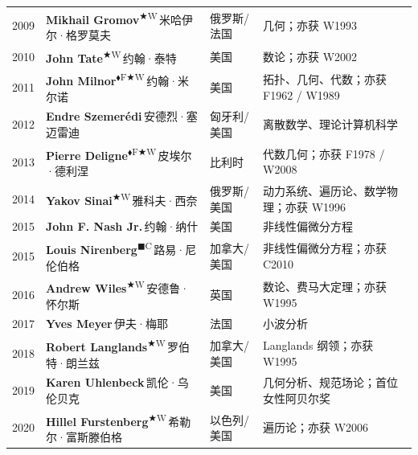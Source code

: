\documentclass[a4paper,10pt]{article}
\newcommand{\Fbadge}{\textsuperscript{\normalfont\scriptsize\sffamily\color{fieldsclr}$\blacklozenge$F}}
\newcommand{\Wbadge}{\textsuperscript{\normalfont\scriptsize\sffamily\color{wolfclr}$\bigstar$W}}
\newcommand{\Cbadge}{\textsuperscript{\normalfont\scriptsize\sffamily\color{chernclr}$\blacksquare$C}}
\begin{document}
\begin{longtable}{
  >{\raggedright}m{1.4cm}
  >{\raggedright}m{7.0cm}
  >{\raggedright}m{4.5cm}
  >{\raggedright\arraybackslash}m{9.5cm}
}
{\color{yearcolor}2009} & {\bfseries Mikhail Gromov}\Wbadge\,{\small\color{mutedgray}米哈伊尔·格罗莫夫} & 俄罗斯/法国 & {\small\color{fieldcolor}几何；亦获 W1993} \\[2pt]
{\color{yearcolor}2010} & {\bfseries John Tate}\Wbadge\,{\small\color{mutedgray}约翰·泰特} & 美国 & {\small\color{fieldcolor}数论；亦获 W2002} \\[2pt]
{\color{yearcolor}2011} & {\bfseries John Milnor}\Fbadge\Wbadge\,{\small\color{mutedgray}约翰·米尔诺} & 美国 & {\small\color{fieldcolor}拓扑、几何、代数；亦获 F1962 / W1989} \\[2pt]
{\color{yearcolor}2012} & {\bfseries Endre Szemerédi}\,{\small\color{mutedgray}安德烈·塞迈雷迪} & 匈牙利/美国 & {\small\color{fieldcolor}离散数学、理论计算机科学} \\[2pt]
{\color{yearcolor}2013} & {\bfseries Pierre Deligne}\Fbadge\Wbadge\,{\small\color{mutedgray}皮埃尔·德利涅} & 比利时 & {\small\color{fieldcolor}代数几何；亦获 F1978 / W2008} \\[2pt]
{\color{yearcolor}2014} & {\bfseries Yakov Sinai}\Wbadge\,{\small\color{mutedgray}雅科夫·西奈} & 俄罗斯/美国 & {\small\color{fieldcolor}动力系统、遍历论、数学物理；亦获 W1996} \\[2pt]
{\color{yearcolor}2015} & {\bfseries John F. Nash Jr.}\,{\small\color{mutedgray}约翰·纳什} & 美国 & {\small\color{fieldcolor}非线性偏微分方程} \\[2pt]
{\color{yearcolor}2015} & {\bfseries Louis Nirenberg}\Cbadge\,{\small\color{mutedgray}路易·尼伦伯格} & 加拿大/美国 & {\small\color{fieldcolor}非线性偏微分方程；亦获 C2010} \\[2pt]
{\color{yearcolor}2016} & {\bfseries Andrew Wiles}\Wbadge\,{\small\color{mutedgray}安德鲁·怀尔斯} & 英国 & {\small\color{fieldcolor}数论、费马大定理；亦获 W1995} \\[2pt]
{\color{yearcolor}2017} & {\bfseries Yves Meyer}\,{\small\color{mutedgray}伊夫·梅耶} & 法国 & {\small\color{fieldcolor}小波分析} \\[2pt]
{\color{yearcolor}2018} & {\bfseries Robert Langlands}\Wbadge\,{\small\color{mutedgray}罗伯特·朗兰兹} & 加拿大/美国 & {\small\color{fieldcolor}Langlands 纲领；亦获 W1995} \\[2pt]
{\color{yearcolor}2019} & {\bfseries Karen Uhlenbeck}\,{\small\color{mutedgray}凯伦·乌伦贝克} & 美国 & {\small\color{fieldcolor}几何分析、规范场论；首位女性阿贝尔奖} \\[2pt]
{\color{yearcolor}2020} & {\bfseries Hillel Furstenberg}\Wbadge\,{\small\color{mutedgray}希勒尔·富斯滕伯格} & 以色列/美国 & {\small\color{fieldcolor}遍历论；亦获 W2006} \\[2pt]

\end{longtable}
\end{document}
